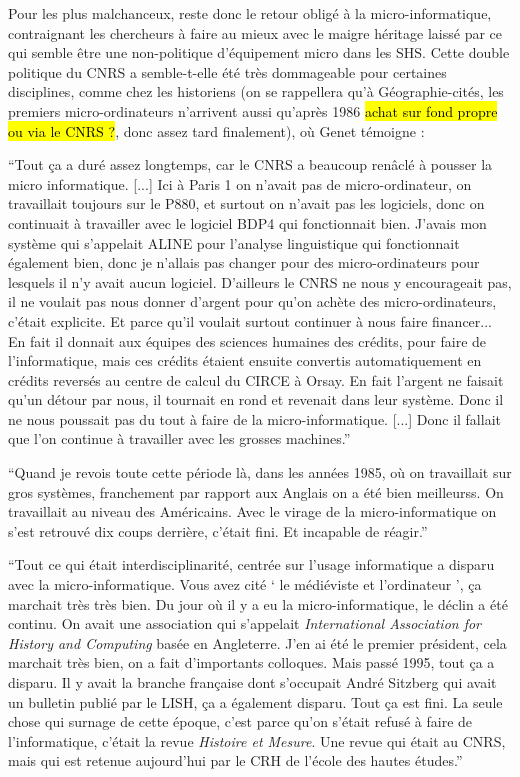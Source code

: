Pour les plus malchanceux, reste donc le retour obligé à la micro-informatique, contraignant les chercheurs à faire au mieux avec le maigre héritage laissé par ce qui semble être une non-politique d'équipement micro dans les SHS. Cette double politique du CNRS a semble-t-elle été très dommageable pour certaines disciplines, comme chez les historiens (on se rappellera qu'à Géographie-cités, les premiers micro-ordinateurs n'arrivent aussi qu'après 1986 \hl{achat sur fond propre ou via le CNRS ?}, donc assez tard finalement), où Genet témoigne :

\enquote{Tout ça a duré assez longtemps, car le CNRS a beaucoup renâclé à pousser la micro informatique. [...] Ici à Paris 1 on n’avait pas de micro-ordinateur, on travaillait toujours sur le P880, et surtout on n’avait pas les logiciels, donc on continuait à travailler avec le logiciel BDP4 qui fonctionnait bien. J'avais mon système qui s'appelait ALINE pour l'analyse linguistique qui fonctionnait également bien, donc je n'allais pas changer pour des micro-ordinateurs pour lesquels il n'y avait aucun logiciel. D'ailleurs le CNRS ne nous y encourageait pas, il ne voulait pas nous donner d'argent pour qu'on achète des micro-ordinateurs, c'était explicite. Et parce qu'il voulait surtout continuer à nous faire financer... En fait il donnait aux équipes des sciences humaines des crédits, pour faire de l'informatique, mais ces crédits étaient ensuite convertis automatiquement en crédits reversés au centre de calcul du CIRCE à Orsay. En fait l'argent ne faisait qu'un détour par nous, il tournait en rond et revenait dans leur système. Donc il ne nous poussait pas du tout à faire de la micro-informatique. [...] Donc il fallait que l'on continue à travailler avec les grosses machines.}

\enquote{Quand je revois toute cette période là, dans les années 1985, où on travaillait sur gros systèmes, franchement par rapport aux Anglais on a été bien meilleurss. On travaillait au niveau des Américains. Avec le virage de la micro-informatique on s'est retrouvé dix coups derrière, c'était fini. Et incapable de réagir.}

\enquote{Tout ce qui était interdisciplinarité, centrée sur l'usage informatique a disparu avec la micro-informatique. Vous avez cité \enquote{ le médiéviste et l'ordinateur }, ça marchait très très bien. Du jour où il y a eu la micro-informatique, le déclin a été continu. On avait une association qui s'appelait \textit{International Association for History and Computing} basée en Angleterre. J'en ai été le premier président, cela marchait très bien, on a fait d'importants colloques. Mais passé 1995, tout ça a disparu. Il y avait la branche française dont s'occupait André Sitzberg qui avait un bulletin publié par le LISH, ça a également disparu. Tout ça est fini. La seule chose qui surnage de cette époque, c'est parce qu'on s'était refusé à faire de l'informatique, c'était la revue \textit{Histoire et Mesure}. Une revue qui était au CNRS, mais qui est retenue aujourd'hui par le CRH de l'école des hautes études.}

